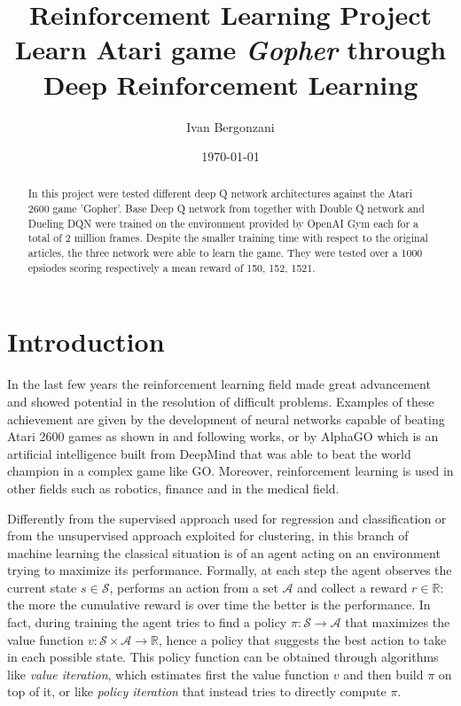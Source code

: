 \documentclass[article,11pt]{article}
\begin{document}
	
	\title{Reinforcement Learning Project\\Learn Atari game \textit{Gopher} through Deep Reinforcement Learning}
	\author{Ivan Bergonzani}
	\date{\today}
	\maketitle
	
	\begin{abstract}
		In this project were tested different deep Q network architectures against the Atari 2600 game 'Gopher'.
		Base Deep Q network from \cite{dqn2013}\cite{dqn2015} together with Double Q network \cite{doubledqn} and Dueling DQN \cite{duelingdqn} were trained on the environment provided by OpenAI Gym each for a total of 2 million frames. Despite the smaller training time with respect to the original articles, the three network were able to learn the game. They were tested over a 1000 epsiodes scoring respectively a mean reward of 150, 152, 1521.
		
	\end{abstract}
	
	
	\section{Introduction}
	 
	In the last few years the reinforcement learning field made great advancement and showed potential in the resolution of difficult problems. Examples of these achievement are given by the development of  neural networks capable of beating Atari 2600 games as shown in \cite{dqn2013} and following works, or by AlphaGO which is an artificial intelligence built from DeepMind that was able to beat the world champion in a complex game like GO. Moreover, reinforcement learning is used in other fields such as robotics, finance and in the medical field.
	
	Differently from the supervised approach used for regression and classification or from the unsupervised approach exploited for clustering, in this branch of machine learning the classical situation is of an agent acting on an environment trying to maximize its performance. Formally, at each step the agent observes the current state $s\in\mathcal{S}$, performs an action from a set $\mathcal{A}$ and collect a reward $r\in\mathbb{R}$: the more the cumulative reward is over time the better is the performance. In fact, during training the agent tries to find a policy $\pi:\mathcal{S}\to\mathcal{A}$ that maximizes the value function $v: \mathcal{S}\times\mathcal{A}\to\mathbb{R}$, hence a policy that suggests the best action to take in each possible state. This policy function can be obtained through algorithms like \textit{value iteration}, which estimates first the value function $v$ and then build $\pi$ on top of it, or like \textit{policy iteration} that instead tries to directly compute $\pi$.
	
\end{document}
